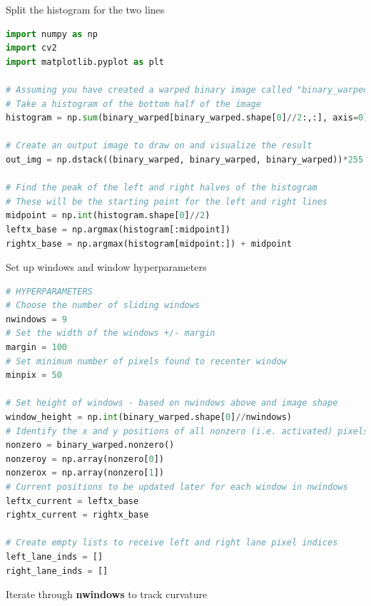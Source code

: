 \documentclass[12pt]{article}
\begin{document}
Split the histogram for the two lines

\begin{lstlisting}[language=Python]
import numpy as np
import cv2
import matplotlib.pyplot as plt

# Assuming you have created a warped binary image called "binary_warped"
# Take a histogram of the bottom half of the image
histogram = np.sum(binary_warped[binary_warped.shape[0]//2:,:], axis=0)

# Create an output image to draw on and visualize the result
out_img = np.dstack((binary_warped, binary_warped, binary_warped))*255

# Find the peak of the left and right halves of the histogram
# These will be the starting point for the left and right lines
midpoint = np.int(histogram.shape[0]//2)
leftx_base = np.argmax(histogram[:midpoint])
rightx_base = np.argmax(histogram[midpoint:]) + midpoint
\end{lstlisting}

Set up windows and window hyperparameters

\begin{lstlisting}[language=Python]
# HYPERPARAMETERS
# Choose the number of sliding windows
nwindows = 9
# Set the width of the windows +/- margin
margin = 100
# Set minimum number of pixels found to recenter window
minpix = 50

# Set height of windows - based on nwindows above and image shape
window_height = np.int(binary_warped.shape[0]//nwindows)
# Identify the x and y positions of all nonzero (i.e. activated) pixels in the image
nonzero = binary_warped.nonzero()
nonzeroy = np.array(nonzero[0])
nonzerox = np.array(nonzero[1])
# Current positions to be updated later for each window in nwindows
leftx_current = leftx_base
rightx_current = rightx_base

# Create empty lists to receive left and right lane pixel indices
left_lane_inds = []
right_lane_inds = []
\end{lstlisting}

Iterate through \textbf{nwindows} to track curvature
\end{document}
